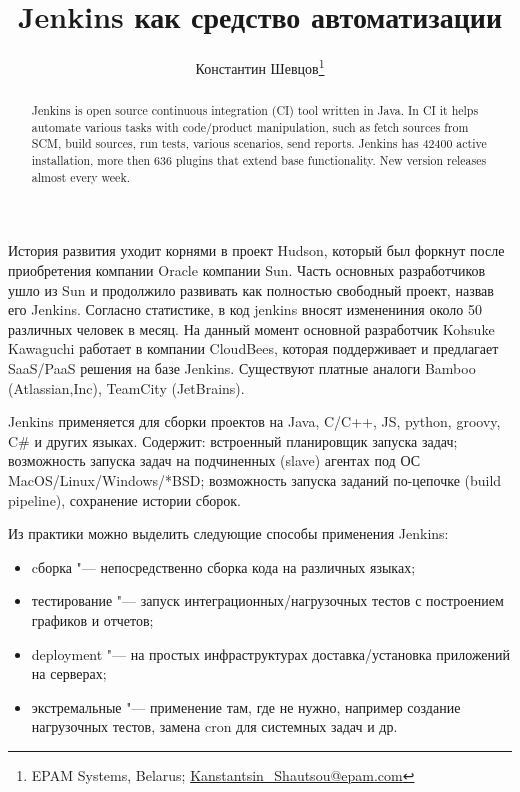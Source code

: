 \documentclass[10pt, a5paper]{article}
\begin{document}
\title{Jenkins как средство автоматизации}%

\author{Константин Шевцов\footnote{EPAM Systems, Belarus; \url{Kanstantsin_Shautsou@epam.com}}}
\maketitle

\begin{abstract}
Jenkins is open source continuous integration (CI) tool written in Java. In CI it helps automate various tasks with code/product manipulation, such as fetch sources from SCM, build sources, run tests, various scenarios, send reports. Jenkins has 42400 active installation, more then 636 plugins that extend base functionality. New version releases almost every week.
\end{abstract}

История развития уходит корнями в проект Hudson, который был форкнут после приобретения компании Oracle компании Sun. Часть основных разработчиков ушло из Sun и продолжило развивать как полностью свободный проект, назвав его Jenkins. Согласно статистике, в код jenkins вносят изменениния около 50 различных человек в месяц. На данный момент основной разработчик Kohsuke Kawaguchi работает в компании CloudBees, которая поддерживает и предлагает SaaS/PaaS решения на базе Jenkins. Существуют платные аналоги Bamboo (Atlassian,Inc), TeamCity (JetBrains).



Jenkins применяется для сборки проектов на Java, C/C++, JS, python, groovy, C\# и других языках. Содержит: встроенный планировщик запуска задач; возможность запуска задач на подчиненных (slave) агентах под ОС MacOS/Linux/Windows/*BSD; возможность запуска заданий по-цепочке (build pipeline), сохранение истории сборок.

Из практики можно выделить следующие способы применения Jenkins:

\begin{itemize}
  \item cборка "--- непосредственно сборка кода на различных языках;
  \item тестирование "--- запуск интеграционных/нагрузочных тестов с построением графиков и отчетов;
  \item deployment "--- на простых инфраструктурах доставка/установка приложений на серверах;
  \item экстремальные "--- применение там, где не нужно, например создание нагрузочных тестов, замена cron для системных задач и др.
\end{itemize}
\end{document}
